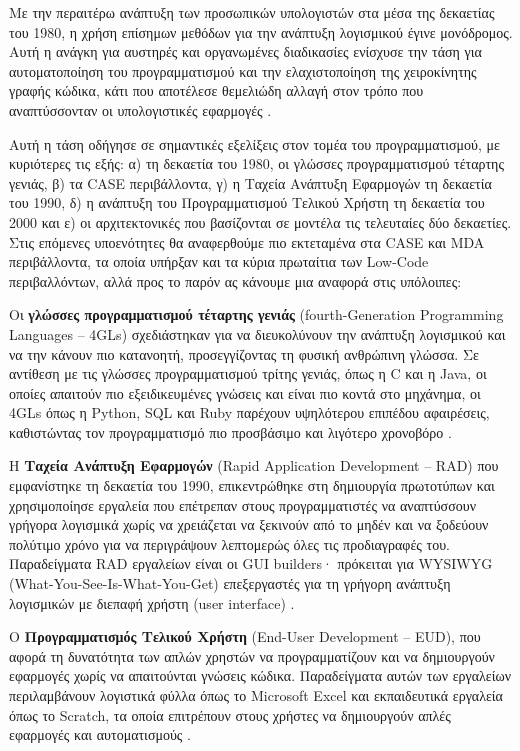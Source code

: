         Με την περαιτέρω ανάπτυξη των προσωπικών υπολογιστών στα μέσα της δεκαετίας του 1980, η χρήση επίσημων μεθόδων για την ανάπτυξη λογισμικού έγινε μονόδρομος. Αυτή η ανάγκη για αυστηρές και οργανωμένες διαδικασίες ενίσχυσε την τάση για αυτοματοποίηση του προγραμματισμού και την ελαχιστοποίηση της χειροκίνητης γραφής κώδικα, κάτι που αποτέλεσε θεμελιώδη αλλαγή στον τρόπο που αναπτύσσονταν οι υπολογιστικές εφαρμογές \cite{Case1985, CASEChikofsky, MDELow}.

        Αυτή η τάση οδήγησε σε σημαντικές εξελίξεις στον τομέα του προγραμματισμού, με κυριότερες τις εξής: α) τη δεκαετία του 1980, οι γλώσσες προγραμματισμού τέταρτης γενιάς, β) τα CASE περιβάλλοντα, γ) η Ταχεία Ανάπτυξη Εφαρμογών τη δεκαετία του 1990, δ) η ανάπτυξη του Προγραμματισμού Τελικού Χρήστη τη δεκαετία του 2000 και ε) οι αρχιτεκτονικές που βασίζονται σε μοντέλα τις τελευταίες δύο δεκαετίες. Στις επόμενες υποενότητες θα αναφερθούμε πιο εκτεταμένα στα CASE και MDA περιβάλλοντα, τα οποία υπήρξαν και τα κύρια πρωταίτια των Low-Code περιβαλλόντων, αλλά προς το παρόν ας κάνουμε μια αναφορά στις υπόλοιπες:

        Οι \textbf{γλώσσες προγραμματισμού τέταρτης γενιάς} (fourth-Generation Programming Languages -- 4GLs) σχεδιάστηκαν για να διευκολύνουν την ανάπτυξη λογισμικού και να την κάνουν πιο κατανοητή, προσεγγίζοντας τη φυσική ανθρώπινη γλώσσα. Σε αντίθεση με τις γλώσσες προγραμματισμού τρίτης γενιάς, όπως η C και η Java, οι οποίες απαιτούν πιο εξειδικευμένες γνώσεις και είναι πιο κοντά στο μηχάνημα, οι 4GLs όπως η Python, SQL και Ruby παρέχουν υψηλότερου επιπέδου αφαιρέσεις, καθιστώντας τον προγραμματισμό πιο προσβάσιμο και λιγότερο χρονοβόρο \cite{wikipediaFourthgenerationProgramming}.

        Η \textbf{Ταχεία Ανάπτυξη Εφαρμογών} (Rapid Application Development -- RAD) που εμφανίστηκε τη δεκαετία του 1990, επικεντρώθηκε στη δημιουργία πρωτοτύπων και χρησιμοποίησε εργαλεία που επέτρεπαν στους προγραμματιστές να αναπτύσσουν γρήγορα λογισμικά χωρίς να χρειάζεται να ξεκινούν από το μηδέν και να ξοδεύουν πολύτιμο χρόνο για να περιγράψουν λεπτομερώς όλες τις προδιαγραφές του. Παραδείγματα RAD εργαλείων είναι οι GUI builders· πρόκειται για WYSIWYG (What-You-See-Is-What-You-Get) επεξεργαστές για τη γρήγορη ανάπτυξη λογισμικών με διεπαφή χρήστη (user interface) \cite{wikipediaRapidApplication}.

        Ο \textbf{Προγραμματισμός Τελικού Χρήστη} (End-User Development -- EUD), που αφορά τη δυνατότητα των απλών χρηστών να προγραμματίζουν και να δημιουργούν εφαρμογές χωρίς να απαιτούνται γνώσεις κώδικα. Παραδείγματα αυτών των εργαλείων περιλαμβάνουν λογιστικά φύλλα όπως το Microsoft Excel και εκπαιδευτικά εργαλεία όπως το Scratch, τα οποία επιτρέπουν στους χρήστες να δημιουργούν απλές εφαρμογές και αυτοματισμούς \cite{wikipediaEnduserDevelopment}.

